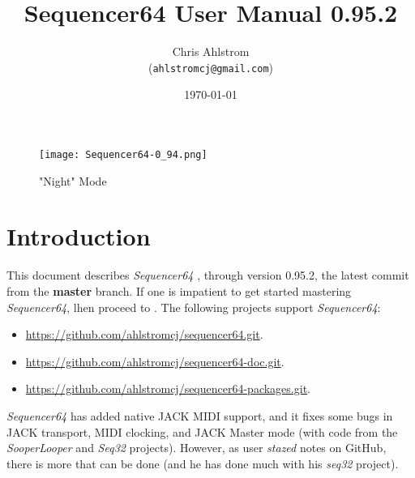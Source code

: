 \documentclass[
 11pt,
 twoside,
 a4paper,
 headinclude,
 footinclude,
 final                                 %
]{article}
\begin{document}
\title{Sequencer64 User Manual 0.95.2}
\author{Chris Ahlstrom \\
   (\texttt{ahlstromcj@gmail.com})}
\date{\today}
\maketitle

\begin{figure}[H]
   \centering 
   \texttt{[image: Sequencer64-0\_94.png]}
   \caption*{"Night" Mode}
\end{figure}

\clearpage                             %

\tableofcontents
\listoffigures                         %
\listoftables                          %


\setlength{\parindent}{2em}
\setlength{\parskip}{1ex plus 0.5ex minus 0.2ex}

\section{Introduction}
\label{sec:introduction}

   This document describes \textsl{Sequencer64}
   \cite{sequencer64}, through version 0.95.2,
   the latest commit from the \textbf{master} branch.
   If one is impatient to get started mastering \textsl{Sequencer64},
   lhen proceed to .
   The following projects support \textsl{Sequencer64}:

   \begin{itemize}
      \item \url{https://github.com/ahlstromcj/sequencer64.git}.
      \item \url{https://github.com/ahlstromcj/sequencer64-doc.git}.
      \item \url{https://github.com/ahlstromcj/sequencer64-packages.git}.
   \end{itemize}

   \textsl{Sequencer64} has added native JACK MIDI support,
   and it fixes some bugs in JACK transport, MIDI clocking, and
   JACK Master mode (with code from the \textsl{SooperLooper} 
   and \textsl{Seq32} projects).
   However, as user \textsl{stazed} notes on GitHub, there is more that can be
   done (and he has done much with his \textsl{seq32} \cite{seq32} project).
\end{document}
